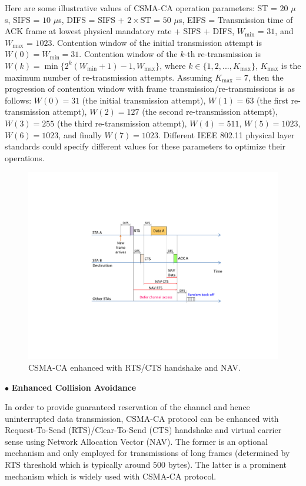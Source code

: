\documentclass[12pt,onecolumn]{article}
\begin{document}
Here are some illustrative values of CSMA-CA operation parameters: ST = $20$ $\mu$s, SIFS = $10$ $\mu$s, DIFS = SIFS + $2\times$ST = $50$ $\mu$s, EIFS = Transmission time of ACK frame at lowest physical mandatory rate + SIFS + DIFS, $W_{\min}$ = $31$, and $W_{\max}$ = $1023$. Contention window of the initial transmission attempt is $W(0)=W_{\min}=31$. Contention window of the $k$-th re-transmission is $W(k)=\min\{2^{k}(W_{\min}+1)-1, W_{\max}\}$, where $k \in \{1,2, ..., K_{\max}\}$, $K_{\max}$ is the maximum number of re-transmission attempts. Assuming $K_{\max}=7$, then the progression of contention window with frame transmission/re-transmissions is as follows: $W(0)=31$ (the initial transmission attempt), $W(1)=63$ (the first re-transmission attempt), $W(2)=127$ (the second re-transmission attempt), $W(3)=255$ (the third re-transmission attempt), $W(4)=511$, $W(5)=1023$, $W(6)=1023$, and finally $W(7)=1023$. Different IEEE 802.11 physical layer standards could specify different values for these parameters to optimize their operations.

\begin{figure}[!t]
\centering
\includegraphics[width=0.65\columnwidth]{figures2/802-11-RTS-CTS-NAV}
\caption{CSMA-CA enhanced with RTS/CTS handshake and NAV.}
\label{figs:802-11-RTS-CTS-NAV}
\end{figure}

\vspace{3mm}
\noindent $\bullet$ \textbf{Enhanced Collision Avoidance}
\vspace{3mm}

\noindent In order to provide guaranteed reservation of the channel and hence uninterrupted data transmission, CSMA-CA protocol can be enhanced with Request-To-Send (RTS)/Clear-To-Send (CTS) handshake and virtual carrier sense using Network Allocation Vector (NAV). The former is an optional mechanism and only employed for transmissions of long frames (determined by RTS threshold which is typically around $500$ bytes). The latter is a prominent mechanism which is widely used with CSMA-CA protocol.
\end{document}
